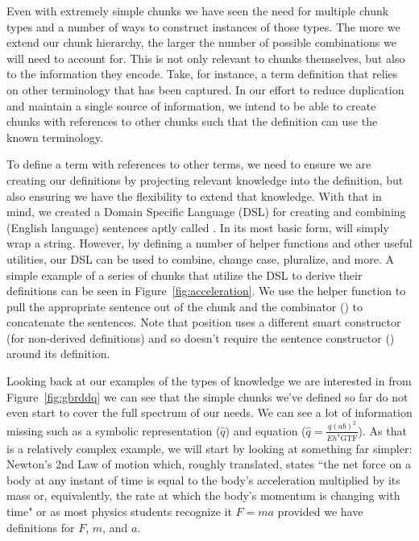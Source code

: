 Even with extremely simple chunks we have seen the need for multiple chunk 
types and a number of ways to construct instances of those types. The more we 
extend our chunk hierarchy, the larger the number of possible combinations we 
will need to account for. This is not only relevant to chunks themselves, but 
also to the information they encode. Take, for instance, a term definition that 
relies on other terminology that has been captured. In our effort to reduce 
duplication and maintain a single source of information, we intend to be able 
to create chunks with references to other chunks such that the definition can 
use the known terminology.


To define a term with references to other terms, we need to ensure we are 
creating our definitions by projecting relevant knowledge into the definition, 
but also ensuring we have the flexibility to extend that knowledge. With that 
in mind, we created a Domain Specific Language (DSL) for creating and combining 
(English language) sentences aptly called . In its most basic 
form,  will simply wrap a string. However, by defining a number 
of helper functions and other useful utilities, our  DSL can be 
used to combine, change case, pluralize, and more. A simple example of a series 
of chunks that utilize the  DSL to derive their definitions can 
be seen in Figure~\ref{fig:acceleration}. We use the  helper 
function to pull the appropriate sentence out of the  chunk and 
the combinator (\codeH{+:+}) to concatenate the sentences. Note that position 
uses a different smart constructor (for non-derived definitions) and so doesn't 
require the sentence constructor () around its definition.


Looking back at our examples of the types of knowledge we are interested in 
from Figure~\ref{fig:gbrddq} we can see that the simple chunks we've defined so 
far do not even start to cover the full spectrum of our needs. We can see a lot 
of information missing such as a symbolic representation ($\hat{q}$) and 
equation ($\hat{q} = \frac{q(ab)^2}{Eh^4\text{GTF}}$). As that is a relatively
complex example, we will start by looking at something far simpler: Newton's 
2nd Law of motion\citep{Newton1687} which, roughly translated, states ``the net 
force on a body at any instant of time is equal to the body's acceleration 
multiplied by its mass or, equivalently, the rate at which the body's momentum 
is changing with time"  or as most physics students recognize it $F=ma$ 
provided we have definitions for $F$, $m$, and $a$.

